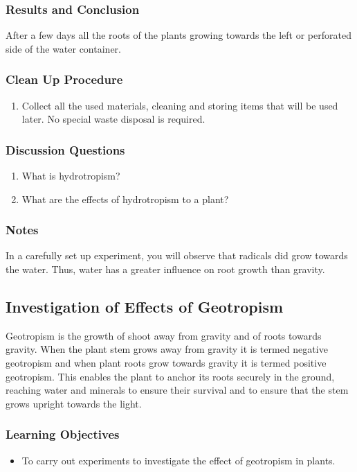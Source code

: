 \subsubsection*{Results and Conclusion}
After a few days all the roots of the plants growing towards the left or perforated side of the water container.

\subsubsection*{Clean Up Procedure}
\begin{enumerate}
\item{Collect all the used materials, cleaning and storing items that will be used later. No special waste disposal is required.}
\end{enumerate}

\subsubsection*{Discussion Questions}
\begin{enumerate}
\item{What is hydrotropism?}
\item{What are the effects of hydrotropism to a plant?}
\end{enumerate}

\subsubsection*{Notes}
In a carefully set up experiment, you will observe that radicals did grow towards the water. Thus, water has a greater influence on root growth than gravity.

\subsection{Investigation of Effects of Geotropism}
Geotropism is the growth of shoot away from gravity and of roots towards gravity. When the plant stem grows away from gravity it is termed negative geotropism and when plant roots grow towards gravity it is termed positive geotropism. This enables the plant to anchor its roots securely in the ground, reaching water and minerals to ensure their survival and to ensure that the stem grows upright towards the light.

\subsubsection*{Learning Objectives}
\begin{itemize}
\item{To carry out experiments to investigate the effect of geotropism in plants.}
\end{itemize}

